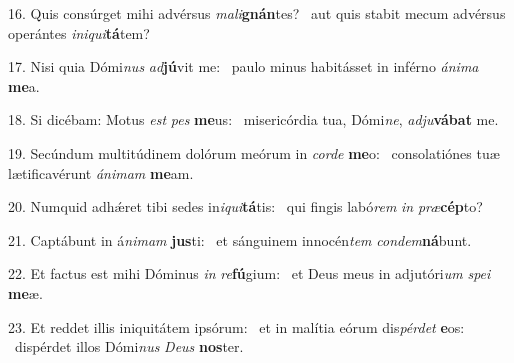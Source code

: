 16. Quis consúrget mihi advérsus \textit{ma}\textit{li}\textbf{gnán}tes? \ast\  aut quis stabit mecum advérsus operántes \textit{in}\textit{i}\textit{qui}\textbf{tá}tem?\

17. Nisi quia Dómi\textit{nus} \textit{ad}\textbf{jú}vit me: \ast\  paulo minus habitásset in inférno \textit{á}\textit{ni}\textit{ma} \textbf{me}a.\

18. Si dicébam: Motus \textit{est} \textit{pes} \textbf{me}us: \ast\  misericórdia tua, Dómi\textit{ne}, \textit{ad}\textit{ju}\textbf{vá}\textbf{bat} me.\

19. Secúndum multitúdinem dolórum meórum in \textit{cor}\textit{de} \textbf{me}o: \ast\  consolatiónes tuæ lætificavérunt \textit{á}\textit{ni}\textit{mam} \textbf{me}am.\

20. Numquid adhǽret tibi sedes in\textit{i}\textit{qui}\textbf{tá}tis: \ast\  qui fingis labó\textit{rem} \textit{in} \textit{præ}\textbf{cép}to?\

21. Captábunt in á\textit{ni}\textit{mam} \textbf{jus}ti: \ast\  et sánguinem innocén\textit{tem} \textit{con}\textit{dem}\textbf{ná}bunt.\

22. Et factus est mihi Dóminus \textit{in} \textit{re}\textbf{fú}gium: \ast\  et Deus meus in adjutóri\textit{um} \textit{spe}\textit{i} \textbf{me}æ.\

23. Et reddet illis iniquitátem ipsórum: \dag\  et in malítia eórum dis\textit{pér}\textit{det} \textbf{e}os: \ast\  dispérdet illos Dómi\textit{nus} \textit{De}\textit{us} \textbf{nos}ter.\

